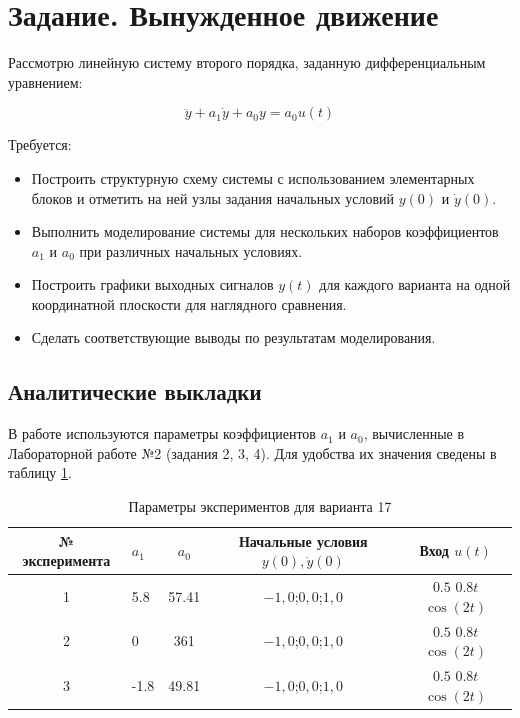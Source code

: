 \documentclass[a4paper,12pt]{article}
\begin{document}
	\newpage
	\tableofcontents
	
	\newpage
	\section{Задание. Вынужденное движение}
	
	Рассмотрю линейную систему второго порядка, заданную дифференциальным уравнением:
	
	\[
	\ddot{y} + a_1 \dot{y} + a_0 y = a_0 u(t) 	
	\]
	
	Требуется:
	
	\begin{itemize}
		\item Построить структурную схему системы с использованием элементарных блоков и отметить на ней узлы задания начальных условий \( y(0) \) и \( \dot{y}(0) \).
		\item Выполнить моделирование системы для нескольких наборов коэффициентов \( a_1 \) и \( a_0 \) при различных начальных условиях.
		\item Построить графики выходных сигналов \( y(t) \) для каждого варианта на одной координатной плоскости для наглядного сравнения.
		\item Сделать соответствующие выводы по результатам моделирования.
	\end{itemize}
	
	\subsection{Аналитические выкладки}
	
	В работе используются параметры коэффициентов \(a_1\) и \(a_0\), вычисленные в Лабораторной работе №2 (задания 2, 3, 4). Для удобства их значения сведены в таблицу \ref{tab:params}.
	
	\begin{table}[H]
		\centering
		\caption{Параметры экспериментов для варианта 17}
		\label{tab:params}
		\renewcommand{\arraystretch}{1.3}
		\begin{tabular}{@{}clccc@{}}
			\toprule
			\textbf{№ эксперимента} & \textbf{\(a_1\)} & \textbf{\(a_0\)} & \textbf{Начальные условия \(y(0), \dot{y}(0)\)} & \textbf{Вход \(u(t)\)} \\
			\midrule
			1 & 5.8 & 57.41 & \(-1, 0\);\quad \(0, 0\);\quad \(1, 0\) & \(0.5\) \quad \(0.8 t\) \quad \(\cos(2t)\)\\
			2 & 0 & 361 & \(-1, 0\);\quad \(0, 0\);\quad \(1, 0\) &\(0.5\) \quad \(0.8 t\) \quad \(\cos(2t)\) \\
			3 & -1.8 & 49.81 & \(-1, 0\);\quad \(0, 0\);\quad \(1, 0\) & \(0.5\) \quad \(0.8 t\) \quad \(\cos(2t)\) \\
			\bottomrule
		\end{tabular}
	\end{table}
	
\end{document}
